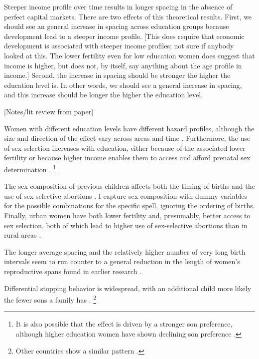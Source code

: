 Steeper income profile over time results in longer spacing in the absence of perfect
capital markets.
There are two effects of this theoretical results.
First, we should see an general increase in spacing across education groups because
development lead to a steeper income profile.
[This does require that economic development is associated with steeper income profiles;
not sure if anybody looked at this.
The lower fertility even for low education women does suggest that income is higher,
but does not, by itself, say anything about the age profile in income.]
Second, the increase in spacing should be stronger the higher the education level is.
In other words, we should see a general increase in spacing, and this increase should be
longer the higher the education level.






[Notes/lit review from paper]

Women with different education levels have different hazard profiles, although the size 
and direction of the effect vary across areas and time 
\citep{Tulasidhar1993,Whitworth2002,Bhalotra2008,Kim2010,Soest2018}.
Furthermore, the use of sex selection increases with education, either because of the 
associated lower fertility or because higher income enables them to access and
afford prenatal sex determination
\citep{das_gupta97,retherford03b,jha06,Guilmoto2009a,Bongaarts2013,Portner2015b,Jayachandran2017}.%
\footnote{
It is also possible that the effect is driven by a stronger son preference, although 
higher education women have shown declining son preference \citep{bhat03,pande07}.
}


The sex composition of previous children affects both the timing of births and the use of 
sex-selective abortions 
\citep{retherford03b,jha06,Bhalotra2008,abrevaya09,Portner2015b,Kumar2016,Soest2018}.
I capture sex composition with dummy variables for the
possible combinations for the specific spell, ignoring the ordering of births.
Finally, urban women have both lower fertility and, presumably, better access to
sex selection, both of which lead to higher use of sex-selective abortions than in 
rural areas \citep{retherford03b,jha06,Portner2015b}.


The longer average spacing and the relatively higher number of very long birth intervals 
seem to run counter to a general reduction in the length of women's reproductive spans 
found in earlier research \citep{Padmadas2004}.


Differential stopping behavior is widespread, with an additional child more likely the
fewer sons a family has 
\citep{repetto72,Das1987,Arnold1997,arnold98,clark00,Basu2010,Barcellos2014}.%
\footnote{
Other countries show a similar pattern
\citep[see, for example,][]{larsen98,filmer09,Altindag2016}.
}


